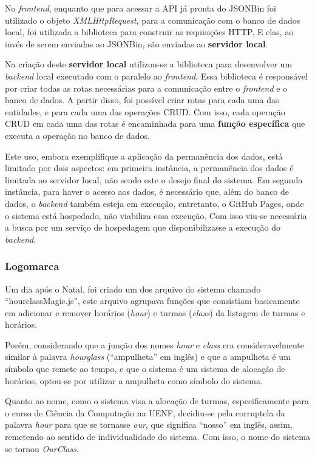No \textit{frontend}, enquanto que para acessar a API já pronta do JSONBin foi utilizado o objeto \textit{XMLHttpRequest}, para a comunicação com o banco de dados local, foi utilizada a biblioteca  para construir as requisições HTTP. E elas, ao invés de serem enviadas ao JSONBin, são enviadas ao \textbf{servidor local}.

Na criação deste \textbf{servidor local} utilizou-se a biblioteca  para desenvolver um \textit{backend} local executado com o  paralelo ao \textit{frontend}. Essa biblioteca é responsável por criar todas as rotas necessárias para a comunicação entre o \textit{frontend} e o banco de dados. A partir disso, foi possível criar rotas para cada uma das entidades, e para cada uma das operações CRUD. Com isso, cada operação CRUD em cada uma das rotas é encaminhada para uma \textbf{função específica} que executa a operação no banco de dados.

Este uso, embora exemplifique a aplicação da permanência dos dados, está limitado por dois aspectos: em primeira instância, a permanência dos dados é limitada ao servidor local, não sendo este o desejo final do sistema. Em segunda instância, para haver o acesso aos dados, é necessário que, além do banco de dados, o \textit{backend} também esteja em execução, entretanto, o GitHub Pages, onde o sistema está hospedado, não viabiliza essa execução. Com isso viu-se necessária a busca por um serviço de hospedagem que disponibilizasse a execução do \textit{backend}.

\subsubsection*{Logomarca} \label{sssec:Logomarca}

Um dia após o Natal, foi criado um dos arquivo do sistema chamado ``hourclassMagic.js'', este arquivo agrupava funções que consistiam basicamente em adicionar e remover horários (\textit{hour}) e turmas (\textit{class}) da listagem de turmas e horários.

Porém, considerando que a junção dos nomes \textit{hour} e \textit{class} era consideravelmente similar à palavra \textit{hourglass} (``ampulheta'' em inglês) e que a ampulheta é um símbolo que remete ao tempo, e que o sistema é um sistema de alocação de horários, optou-se por utilizar a ampulheta como símbolo do sistema.

Quanto ao nome, como o sistema visa a alocação de turmas, especificamente para o curso de Ciência da Computação na UENF, decidiu-se pela corruptela da palavra \textit{hour} para que se tornasse \textit{our}, que significa ``nosso'' em inglês, assim, remetendo ao sentido de individualidade do sistema. Com isso, o nome do sistema se tornou \textit{OurClass}.

